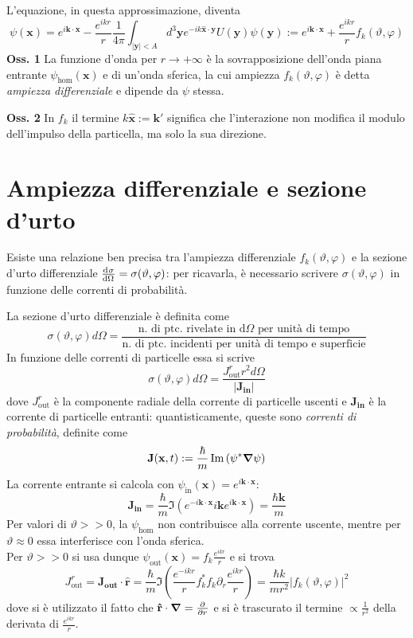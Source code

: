 L'equazione, in questa approssimazione, diventa
$$\psi(\mathbf{x}) = e^{i\mathbf{k}\cdot\mathbf{x}} - \frac{e^{ikr}}{r}\frac{1}{4\pi}
\int_{|\mathbf{y}|<A}^{}d^3\mathbf{y}e^{-ik\mathbf{\hat x}\cdot\mathbf{y}}U(\mathbf{y})
\psi(\mathbf{y}):=e^{i\mathbf{k}\cdot\mathbf{x}}+\frac{e^{ikr}}{r}f_k(\vartheta,\varphi)
$$
\textbf{Oss. 1} La funzione d'onda per $r\to+\infty$ è la sovrapposizione dell'onda piana
entrante $\psi_\text{hom}(\mathbf{x})$ e di un'onda sferica, la cui ampiezza $f_k(\vartheta,\varphi)$
è detta \textit{ampiezza differenziale} e dipende da $\psi$ stessa.

\textbf{Oss. 2} In $f_k$ il termine $k\mathbf{\hat x}:=\mathbf{k'}$ significa che
l'interazione non modifica il modulo dell'impulso della particella, ma solo la sua direzione.
\section{Ampiezza differenziale e sezione d'urto}
Esiste una relazione ben precisa tra l'ampiezza differenziale $f_k(\vartheta,\varphi)$ e la sezione
d'urto differenziale $\dv[]{\sigma}{\Omega}=\sigma(\vartheta,\varphi)$: per ricavarla, è necessario
scrivere $\sigma(\vartheta,\varphi)$ in funzione delle correnti di probabilità.

La sezione d'urto differenziale è definita come
$$\sigma\left(\vartheta,\varphi\right)d\Omega=
\frac{\text{n. di ptc. rivelate in d$\Omega$ per unità di tempo}}
{\text{n. di ptc. incidenti per unità di tempo e superficie}}$$
In funzione delle correnti di particelle essa si scrive
$$\sigma(\vartheta,\varphi)d\Omega = \frac{J^r_\text{out}r^2d\Omega}{\left|\mathbf{J_\textbf{in}}
\right|}$$
dove $J^r_\text{out}$ è la componente radiale della corrente di particelle uscenti e
$\mathbf{J_\textbf{in}}$ è la corrente di particelle entranti: quantisticamente, queste sono
\textit{correnti di probabilità}, definite come
$$\mathbf{J}(\mathbf{x},t):=\frac{\hbar}{m}\Im\left(\psi^*\gradient\psi\right)$$
La corrente entrante si calcola con $\psi_\text{in}(\mathbf{x}) = e^{i\mathbf{k}\cdot\mathbf{x}}$:
$$\mathbf{J_\textbf{in}} = \frac{\hbar}{m}\Im\left(e^{-i\mathbf{k}\cdot\mathbf{x}}i\mathbf{k}
e^{i\mathbf{k}\cdot\mathbf{x}}\right) = \frac{\hbar \mathbf{k}}{m}$$
Per valori di $\vartheta>>0$, la $\psi_\text{hom}$ non contribuisce alla corrente uscente, mentre
per $\vartheta\approx0$ essa interferisce con l'onda sferica.\\
Per $\vartheta>>0$ si usa dunque $\psi_\text{out}(\mathbf{x}) = f_k\frac{e^{ikr}}{r}$ e si trova
$$J^r_\text{out} = \mathbf{J_\textbf{out}}\cdot\mathbf{\hat r} = 
\frac{\hbar}{m}\Im \left(\frac{e^{-ikr}}{r}f^*_kf_k\partial_r\frac{e^{ikr}}{r}\right) = 
\frac{\hbar k}{mr^2}\left|f_k(\vartheta,\varphi)\right|^2
$$
dove si è utilizzato il fatto che $\mathbf{\hat r}\cdot\gradient = \pdv[]{}{r}$ e si è trascurato il
termine $\propto \frac{1}{r^2}$ della derivata di $\frac{e^{ikr}}{r}$.

